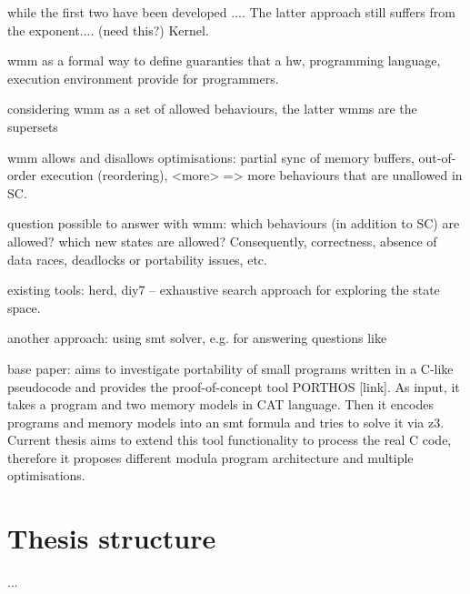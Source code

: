 while the first two have been developed .... 
The latter approach still suffers from the exponent.... (need this?)
Kernel.


wmm as a formal way to define guaranties that a hw, programming language, execution environment provide for programmers.

considering wmm as a set of allowed behaviours, the latter wmms are the supersets

wmm allows and disallows optimisations: partial sync of memory buffers, out-of-order execution (reordering), <more> => more behaviours that are unallowed in SC.

question possible to answer with wmm: which behaviours (in addition to SC) are allowed? which new states are allowed? Consequently, correctness, absence of data races, deadlocks or portability issues, etc.

existing tools: herd, diy7 -- exhaustive search approach for exploring the state space.

another approach: using smt solver, e.g. for answering questions like 

base paper: aims to investigate portability of small programs written in a C-like pseudocode and provides the proof-of-concept tool PORTHOS [link]. As input, it takes a program and two memory models in CAT language. Then it encodes programs and memory models into an smt formula and tries to solve it via z3. Current thesis aims to extend this tool functionality to process the real C code, therefore it proposes different modula program architecture and multiple optimisations.



\section{Thesis structure}
\label{section:introduction:structure}

...